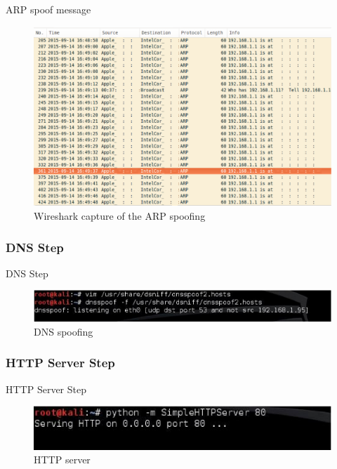 \documentclass{beamer}
\begin{document}
\begin{frame}{ARP spoof message}

	\begin{figure}[!h]
		\centering
		\includegraphics[scale=0.2]{../images/wiresharArpSpoof.eps}
		\caption{Wireshark capture of the ARP spoofing}
		\label{Wireshark_ARP_Spoof}
	\end{figure}
\end{frame}

\subsubsection{DNS Step}
\begin{frame}{DNS Step}
	\begin{figure}[!h]
		\centering
		\includegraphics[scale=0.50]{../images/dnsSpoof.eps}
		\caption{DNS spoofing}
		\label{DNS_spoofing}
	\end{figure}
\end{frame}

\subsubsection{HTTP Server Step}
\begin{frame}{HTTP Server Step}
	\begin{figure}[!h]
		\centering
		\includegraphics[scale=0.75]{../images/serverHTTP.eps}
		\caption{HTTP server}
		\label{serverHTTP}
	\end{figure}
\end{frame}
\end{document}
